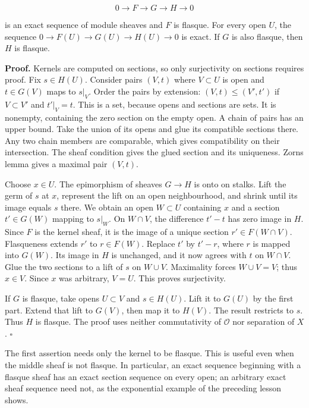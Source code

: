 \documentclass[
  english,
  11pt,
  a4paper,
]{article}
\begin{document}
\[0\longrightarrow F\longrightarrow G\longrightarrow H\longrightarrow0\]

is an exact sequence of module sheaves and \(F\) is flasque. For every
open \(U\), the sequence \(0\to F(U)\to G(U)\to H(U)\to0\) is exact. If
\(G\) is also flasque, then \(H\) is flasque.

\textbf{Proof.} Kernels are computed on sections, so only surjectivity
on sections requires proof. Fix \(s\in H(U)\). Consider pairs \((V,t)\)
where \(V\subset U\) is open and \(t\in G(V)\) maps to \(s|_V\). Order
the pairs by extension: \((V,t)\le(V',t')\) if \(V\subset V'\) and
\(t'|_V=t\). This is a set, because opens and sections are sets. It is
nonempty, containing the zero section on the empty open. A chain of
pairs has an upper bound. Take the union of its opens and glue its
compatible sections there. Any two chain members are comparable, which
gives compatibility on their intersection. The sheaf condition gives the
glued section and its uniqueness. Zorn\textquotesingle s lemma gives a
maximal pair \((V,t)\).

Choose \(x\in U\). The epimorphism of sheaves \(G\to H\) is onto on
stalks. Lift the germ of \(s\) at \(x\), represent the lift on an open
neighbourhood, and shrink until its image equals \(s\) there. We obtain
an open \(W\subset U\) containing \(x\) and a section \(t'\in G(W)\)
mapping to \(s|_W\). On \(W\cap V\), the difference \(t'-t\) has zero
image in \(H\). Since \(F\) is the kernel sheaf, it is the image of a
unique section \(r'\in F(W\cap V)\). Flasqueness extends \(r'\) to
\(r\in F(W)\). Replace \(t'\) by \(t'-r\), where \(r\) is mapped into
\(G(W)\). Its image in \(H\) is unchanged, and it now agrees with \(t\)
on \(W\cap V\). Glue the two sections to a lift of \(s\) on \(W\cup V\).
Maximality forces \(W\cup V=V\); thus \(x\in V\). Since \(x\) was
arbitrary, \(V=U\). This proves surjectivity.

If \(G\) is flasque, take opens \(U\subset V\) and \(s\in H(U)\). Lift
it to \(G(U)\) by the first part. Extend that lift to \(G(V)\), then map
it to \(H(V)\). The result restricts to \(s\). Thus \(H\) is flasque.
The proof uses neither commutativity of \(\mathcal O\) nor separation of
\(X\). \(\square\)

The first assertion needs only the kernel to be flasque. This is useful
even when the middle sheaf is not flasque. In particular, an exact
sequence beginning with a flasque sheaf has an exact section sequence on
every open; an arbitrary exact sheaf sequence need not, as the
exponential example of the preceding lesson shows.
\end{document}
